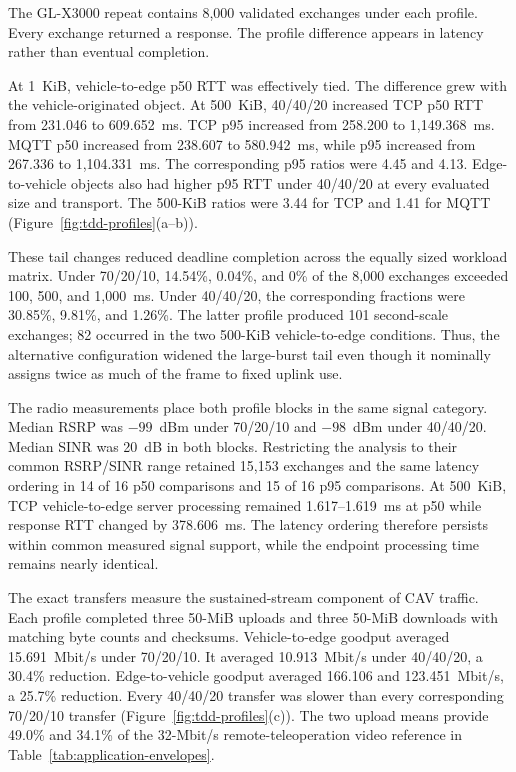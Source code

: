 The GL-X3000 repeat contains 8,000 validated exchanges under each profile.
Every exchange returned a response. The profile difference appears in latency
rather than eventual completion.

At 1~KiB, vehicle-to-edge p50 RTT was effectively tied. The difference grew
with the vehicle-originated object. At 500~KiB, 40/40/20 increased TCP p50 RTT
from 231.046 to 609.652~ms. TCP p95 increased from 258.200 to
1,149.368~ms. MQTT p50 increased from 238.607 to 580.942~ms, while p95
increased from 267.336 to 1,104.331~ms. The corresponding p95 ratios were 4.45
and 4.13. Edge-to-vehicle objects also had higher p95 RTT under 40/40/20
at every evaluated size and transport. The 500-KiB ratios were 3.44 for TCP
and 1.41 for MQTT (Figure~\ref{fig:tdd-profiles}(a--b)).

These tail changes reduced deadline completion across the equally sized
workload matrix. Under 70/20/10, 14.54\%, 0.04\%, and 0\% of the 8,000
exchanges exceeded 100, 500, and 1,000~ms. Under 40/40/20, the corresponding
fractions were 30.85\%, 9.81\%, and 1.26\%. The latter profile produced 101
second-scale exchanges; 82 occurred in the two 500-KiB vehicle-to-edge
conditions. Thus, the alternative configuration widened the large-burst tail
even though it nominally assigns twice as much of the frame to fixed uplink
use.

The radio measurements place both profile blocks in the same signal category.
Median RSRP was $-99$~dBm under 70/20/10 and $-98$~dBm under 40/40/20. Median
SINR was 20~dB in both blocks. Restricting the analysis to their common
RSRP/SINR range retained 15,153 exchanges and the same latency ordering in 14
of 16 p50 comparisons and 15 of 16 p95 comparisons. At 500~KiB, TCP
vehicle-to-edge server processing remained 1.617--1.619~ms at p50 while
response RTT changed by 378.606~ms. The latency ordering therefore persists
within common measured signal support, while the endpoint processing time
remains nearly identical.

The exact transfers measure the sustained-stream component of CAV traffic.
Each profile completed three 50-MiB uploads and three 50-MiB downloads with
matching byte counts and checksums. Vehicle-to-edge goodput averaged
15.691~Mbit/s under 70/20/10. It averaged 10.913~Mbit/s under 40/40/20, a
30.4\% reduction. Edge-to-vehicle goodput averaged 166.106 and
123.451~Mbit/s, a 25.7\% reduction. Every 40/40/20 transfer was slower than every corresponding
70/20/10 transfer (Figure~\ref{fig:tdd-profiles}(c)). The two upload means
provide 49.0\% and 34.1\% of the 32-Mbit/s remote-teleoperation video reference
in Table~\ref{tab:application-envelopes}.

